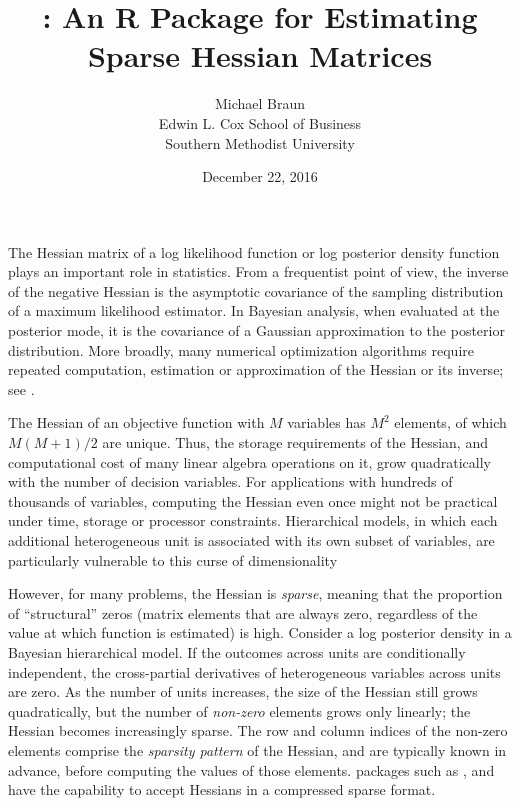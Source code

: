 \documentclass[jss]{jss}\usepackage[]{graphicx}\usepackage[]{color}
\author{Michael Braun\\Edwin L. Cox School of Business\\Southern Methodist University}
\title{\pkg{sparseHessianFD}: An R Package for Estimating Sparse Hessian Matrices}
\date{December 22, 2016}
\begin{document}
The Hessian matrix of a log likelihood function or log posterior
density function plays
an important role in statistics.  From a frequentist point of view,
the inverse of the negative Hessian is the asymptotic covariance of
the sampling distribution of a maximum
likelihood estimator.  In Bayesian analysis, when evaluated at the
posterior mode, it is the covariance of a Gaussian approximation to
the posterior distribution.  More broadly, many numerical optimization
algorithms require repeated computation, estimation or approximation
of the Hessian or its inverse; see \citet{NocedalWright2006}.

The Hessian of an objective function with $M$ variables has $M^2$
elements, of which $M(M+1)/2$ are unique.  Thus, the storage
requirements of the Hessian, and computational cost of many linear
algebra operations on it, grow quadratically with the number of
decision variables.   For
applications with hundreds of thousands of variables, computing the
Hessian even once might not be practical under time, storage or
processor constraints.  Hierarchical models, in
which each additional heterogeneous unit is associated with its own subset of
variables, are particularly vulnerable to this curse of dimensionality

However, for many problems, the Hessian is
\emph{sparse}, meaning that the proportion of  ``structural''  zeros
(matrix elements that are always zero, regardless of the value at which
function is estimated) is high.  Consider a log
posterior density in a Bayesian hierarchical
model.  If the outcomes across units are conditionally
independent, the cross-partial derivatives of heterogeneous variables
across units are zero.  As the number of units
increases, the size of the Hessian still grows quadratically, but the number
of \emph{non-zero} elements grows only linearly; the Hessian
becomes increasingly sparse.  The row and column indices of the
non-zero elements comprise the \emph{sparsity pattern} of the Hessian,
and are typically known in advance, before computing the values of
those elements.   packages such as 
\citep{R_trustOptim},  \citep{R_sparseMVN} and
 \citep{R_ipoptr} have the capability to accept Hessians
in a compressed sparse format.
\end{document}
